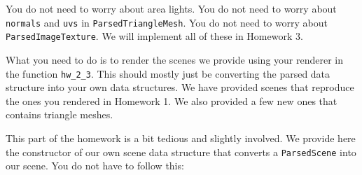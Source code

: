 You do not need to worry about area lights.
You do not need to worry about \lstinline{normals} and \lstinline{uvs} in \lstinline{ParsedTriangleMesh}.
You do not need to worry about \lstinline{ParsedImageTexture}.
We will implement all of these in Homework 3.

What you need to do is to render the scenes we provide using your renderer in the function \lstinline{hw_2_3}. This should mostly just be converting the parsed data structure into your own data structures. 
We have provided scenes that reproduce the ones you rendered in Homework 1. 
We also provided a few new ones that contains triangle meshes.

This part of the homework is a bit tedious and slightly involved. We provide here the constructor of our own scene data structure that converts a \lstinline{ParsedScene} into our scene. You do not have to follow this:
